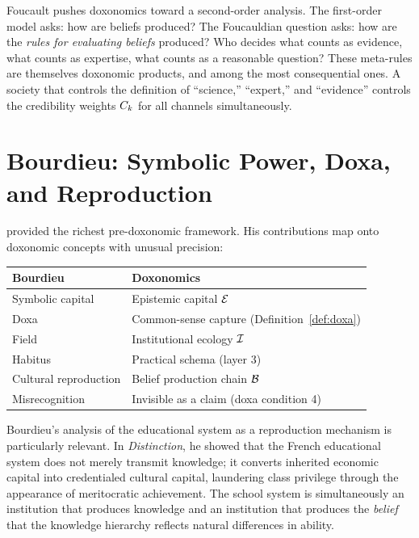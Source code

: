 \begin{remark}
Foucault pushes doxonomics toward a second-order analysis.
The first-order model asks: how are beliefs produced?
The Foucauldian question asks: how are the \emph{rules for evaluating beliefs} produced?
Who decides what counts as evidence, what counts as expertise, what counts as a reasonable question?
These meta-rules are themselves doxonomic products, and among the most consequential ones.
A society that controls the definition of ``science,'' ``expert,'' and ``evidence'' controls the credibility weights $C_{k}$ for all channels simultaneously.
\end{remark}


\section{Bourdieu: Symbolic Power, Doxa, and Reproduction}
\label{sec:ch3-bourdieu}

\textcite{bourdieu1984, bourdieu1991} provided the richest pre-doxonomic framework.
His contributions map onto doxonomic concepts with unusual precision:

\begin{center}
\begin{tabular}{ll}
\toprule
\textbf{Bourdieu} & \textbf{Doxonomics} \\
\midrule
Symbolic capital & Epistemic capital $\mathcal{E}$ \\
Doxa & Common-sense capture (Definition~\ref{def:doxa}) \\
Field & Institutional ecology $\mathcal{I}$ \\
Habitus & Practical schema (layer 3) \\
Cultural reproduction & Belief production chain $\mathcal{B}$ \\
Misrecognition & Invisible as a claim (doxa condition 4) \\
\bottomrule
\end{tabular}
\end{center}

Bourdieu's analysis of the educational system as a reproduction mechanism is particularly relevant.
In \textit{Distinction}, he showed that the French educational system does not merely transmit knowledge; it converts inherited economic capital into credentialed cultural capital, laundering class privilege through the appearance of meritocratic achievement.
The school system is simultaneously an institution that produces knowledge and an institution that produces the \emph{belief} that the knowledge hierarchy reflects natural differences in ability.

